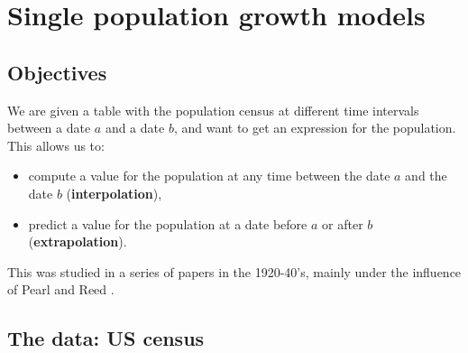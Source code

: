 \chapter{Single population growth models}
\label{chap:single_pop_growth}



\section{Objectives}
We are given a table with the population census at different time intervals between a date $a$ and a date $b$, and want to get an expression for the population. This allows us to: 
\begin{itemize}
\item compute a value for the population at any time between the date $a$ and the date $b$ (\textbf{interpolation}),
\item predict a value for the population at a date before $a$ or after $b$ (\textbf{extrapolation}).
\end{itemize}


This was studied in a series of papers in the 1920-40's, mainly under the influence of Pearl and Reed \cite{PearlReed1920,PearlReed1930,PearlReedFish1940}.


\section{The data: US census}



